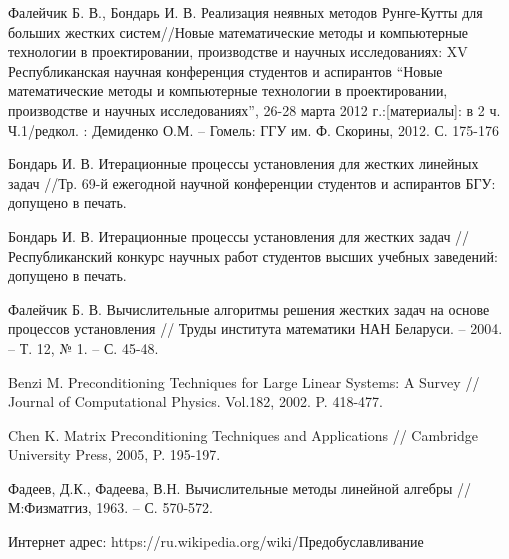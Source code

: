 \documentclass[a4paper,14pt]{extreport}
\begin{document}
\begin{thebibliography}{99}
Фалейчик Б. В., Бондарь И. В. Реализация неявных методов Рунге-Кутты для больших жестких систем//Новые математические методы и компьютерные технологии в проектировании, производстве и научных исследованиях: XV Республиканская научная конференция студентов и аспирантов ``Новые математические методы и компьютерные технологии в проектировании, производстве и научных исследованиях'', 26-28 марта 2012 г.:[материалы]: в 2 ч. Ч.1/редкол. : Демиденко О.М. -- Гомель: ГГУ им. Ф. Скорины, 2012. С. 175-176

Бондарь И. В. Итерационные процессы установления для жестких линейных задач //Тр. 69-й ежегодной научной конференции студентов и аспирантов БГУ: допущено в печать.

Бондарь И. В. Итерационные процессы установления для жестких задач //Республиканский конкурс научных работ студентов высших учебных заведений: допущено в печать.

Фалейчик Б. В. Вычислительные алгоритмы решения жестких задач на основе процессов установления // Труды института математики НАН Беларуси. -- 2004. -- Т. 12, № 1. -- С. 45-48.

Benzi M. Preconditioning Techniques for Large Linear Systems: A Survey // Journal of Computational Physics. Vol.182, 2002. P. 418-477.

Chen K. Matrix Preconditioning Techniques and Applications // Cambridge University Press, 2005, P. 195-197.

Фадеев, Д.К., Фадеева, В.Н. Вычислительные методы линейной алгебры // М:Физматгиз, 1963. -- С. 570-572.

 Интернет адрес: https://ru.wikipedia.org/wiki/Предобуславливание
\end{thebibliography}


  \appendix
\end{document}
